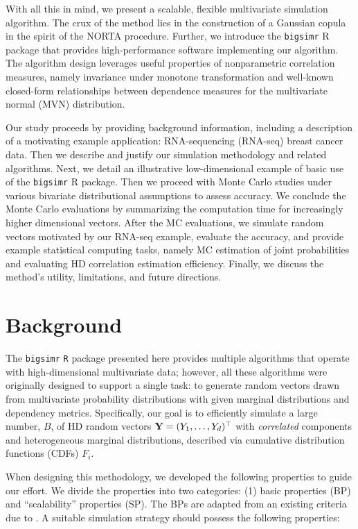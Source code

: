 \documentclass[
]{jss}
\begin{document}
With all this in mind, we present a scalable, flexible multivariate
simulation algorithm. The crux of the method lies in the construction of
a Gaussian copula in the spirit of the NORTA procedure. Further, we
introduce the \texttt{bigsimr} R package that provides high-performance
software implementing our algorithm. The algorithm design leverages
useful properties of nonparametric correlation measures, namely
invariance under monotone transformation and well-known closed-form
relationships between dependence measures for the multivariate normal
(MVN) distribution.

Our study proceeds by providing background information, including a
description of a motivating example application: RNA-sequencing
(RNA-seq) breast cancer data. Then we describe and justify our
simulation methodology and related algorithms. Next, we detail an
illustrative low-dimensional example of basic use of the
\texttt{bigsimr} R package. Then we proceed with Monte Carlo studies
under various bivariate distributional assumptions to assess accuracy.
We conclude the Monte Carlo evaluations by summarizing the computation
time for increasingly higher dimensional vectors. After the MC
evaluations, we simulate random vectors motivated by our RNA-seq
example, evaluate the accuracy, and provide example statistical
computing tasks, namely MC estimation of joint probabilities and
evaluating HD correlation estimation efficiency. Finally, we discuss the
method's utility, limitations, and future directions.

\hypertarget{background}{%
\section{Background}\label{background}}

The \texttt{bigsimr} \texttt{R} package presented here provides multiple
algorithms that operate with high-dimensional multivariate data;
however, all these algorithms were originally designed to support a
single task: to generate random vectors drawn from multivariate
probability distributions with given marginal distributions and
dependency metrics. Specifically, our goal is to efficiently simulate a
large number, \(B\), of HD random vectors
\({\bf Y}=(Y_1, \ldots, Y_d)^\top\) with \emph{correlated} components
and heterogeneous marginal distributions, described via cumulative
distribution functions (CDFs) \(F_i\).

When designing this methodology, we developed the following properties
to guide our effort. We divide the properties into two categories: (1)
basic properties (BP) and ``scalability'' properties (SP). The BPs are
adapted from an existing criteria due to \citet{Nik13a}. A suitable
simulation strategy should possess the following properties:
\end{document}
